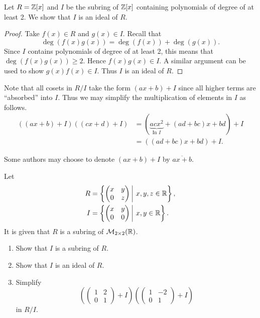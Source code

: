 \begin{example}
    Let $R = \mathbb{Z}[x]$ and $I$ be the subring of $\mathbb{Z}[x]$ containing polynomials of degree of at least 2. We show that $I$ is an ideal of $R$.
    \begin{proof}
        Take $f(x) \in R$ and $g(x) \in I$. Recall that
        \[
            \deg(f(x)g(x)) = \deg(f(x)) + \deg(g(x)).
        \]
        Since $I$ contains polynomials of degree of at least 2, this means that $\deg(f(x)g(x)) \geq 2$. Hence $f(x)g(x) \in I$. A similar argument can be used to show $g(x)f(x) \in I$. Thus $I$ is an ideal of $R$.
    \end{proof}
    Note that all cosets in $R/I$ take the form $(ax+b) + I$ since all higher terms are ``absorbed'' into $I$. Thus we may simplify the multiplication of elements in $I$ as follows.
    \begin{align*}
        ((ax+b)+I)((cx+d)+I) &= (\underbrace{acx^2}_{\text{In } I} + (ad+bc)x + bd) + I\\
        &= ((ad+bc)x + bd) + I.
    \end{align*}
\end{example}
\begin{remark}
    Some authors may choose to denote $(ax+b) + I$ by $\overline{ax+b}$.
\end{remark}
\begin{exercise}
    Let
    \begin{align*}
        R &= \left\{\begin{pmatrix}x&y\\0&z\end{pmatrix} \vert x,y,z \in \R\right\},\\
        I &= \left\{\begin{pmatrix}x&y\\0&0\end{pmatrix} \vert x,y \in \R\right\}.
    \end{align*}
    It is given that $R$ is a subring of $\mathcal{M}_{2\times2}(\mathbb{R})$.
    \begin{enumerate}[label=(\roman*)]
        \item Show that $I$ is a subring of $R$.
        \item Show that $I$ is an ideal of $R$.
        \item Simplify
        \[
            \left(\begin{pmatrix}1&2\\0&1\end{pmatrix} + I\right)\left(\begin{pmatrix}1&-2\\0&1\end{pmatrix} + I\right)
        \]
        in $R/I$.
    \end{enumerate}
\end{exercise}

